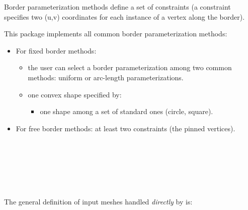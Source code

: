 
Border parameterization methods define a
set of constraints (a constraint specifies two (u,v) coordinates for
each instance of a vertex along the border).

This package implements all common border parameterization methods:
\begin{itemize}

\item For fixed border methods:

    \begin{itemize}

    \item the user can select a border
        parameterization among two common methods: uniform or
        arc-length parameterizations.

    \item one convex shape specified by:

        \begin{itemize}

        \item one shape among a set of standard ones (circle, square).

        \end{itemize}

    \end{itemize}

\item For free border methods: at least two constraints (the pinned
vertices).

\end{itemize}

  \\
  \\
  \\
  \\
  \\



The general definition of input meshes handled \emph{directly} by  is:

